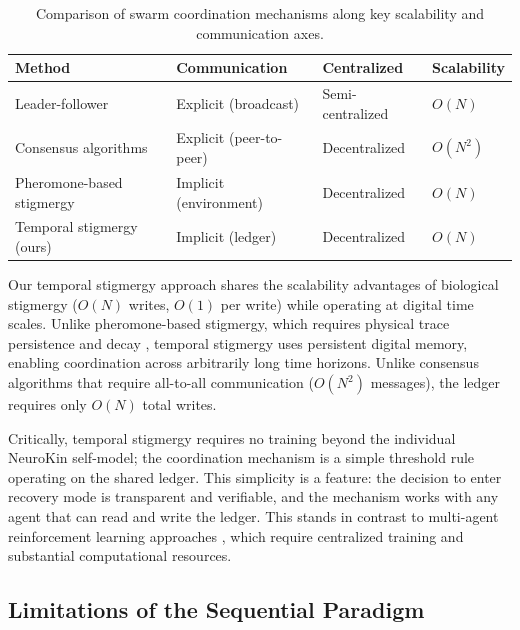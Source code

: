 \documentclass[12pt,a4paper,oneside]{report}
\begin{document}
\begin{table}[H]
\centering
\small
\setlength{\tabcolsep}{4pt}
\caption{Comparison of swarm coordination mechanisms along key scalability and communication axes.}
\label{tab:coordination_comparison}
\begin{tabular}{>{\raggedright\arraybackslash}p{4.0cm} >{\raggedright\arraybackslash}p{4.0cm} >{\centering\arraybackslash}p{2.6cm} >{\centering\arraybackslash}p{2.6cm}}
\toprule
\textbf{Method} & \textbf{Communication} & \textbf{Centralized} & \textbf{Scalability} \\
\midrule
Leader-follower & Explicit (broadcast) & Semi-centralized & $O(N)$ \\
Consensus algorithms & Explicit (peer-to-peer) & Decentralized & $O(N^2)$ \\
Pheromone-based stigmergy & Implicit (environment) & Decentralized & $O(N)$ \\
Temporal stigmergy (ours) & Implicit (ledger) & Decentralized & $O(N)$ \\
\bottomrule
\end{tabular}
\end{table}

Our temporal stigmergy approach shares the scalability advantages of biological stigmergy ($O(N)$ writes, $O(1)$ per write) while operating at digital time scales. Unlike pheromone-based stigmergy, which requires physical trace persistence and decay \cite{bongard2006resilient}, temporal stigmergy uses persistent digital memory, enabling coordination across arbitrarily long time horizons. Unlike consensus algorithms that require all-to-all communication ($O(N^2)$ messages), the ledger requires only $O(N)$ total writes.

Critically, temporal stigmergy requires no training beyond the individual NeuroKin self-model; the coordination mechanism is a simple threshold rule operating on the shared ledger. This simplicity is a feature: the decision to enter recovery mode is transparent and verifiable, and the mechanism works with any agent that can read and write the ledger. This stands in contrast to multi-agent reinforcement learning approaches \cite{domberg2026selfadapting, daneshmand2026slowrl}, which require centralized training and substantial computational resources.

\subsection{Limitations of the Sequential Paradigm}
\label{subsec:limitations_of_the_sequential_paradigm}
\end{document}
